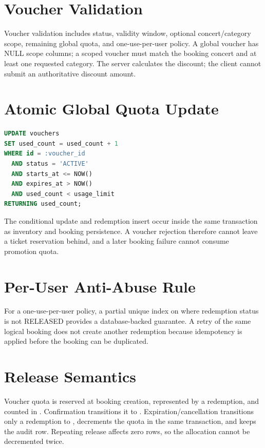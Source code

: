 \section{Voucher Validation}
Voucher validation includes status, validity window, optional concert/category
scope, remaining global quota, and one-use-per-user policy. A global voucher
has NULL scope columns; a scoped voucher must match the booking concert and at
least one requested category. The server calculates the discount; the client
cannot submit an authoritative discount amount.

\section{Atomic Global Quota Update}
\begin{lstlisting}[language=SQL,caption={Atomic voucher quota reservation}]
UPDATE vouchers
SET used_count = used_count + 1
WHERE id = :voucher_id
  AND status = 'ACTIVE'
  AND starts_at <= NOW()
  AND expires_at > NOW()
  AND used_count < usage_limit
RETURNING used_count;
\end{lstlisting}

The conditional update and redemption insert occur inside the same transaction
as inventory and booking persistence. A voucher rejection therefore cannot
leave a ticket reservation behind, and a later booking failure cannot consume
promotion quota.

\section{Per-User Anti-Abuse Rule}
For a one-use-per-user policy, a partial unique index on
 where redemption status is not RELEASED provides
a database-backed guarantee. A retry of the same logical booking does not
create another redemption because idempotency is applied before the booking can
be duplicated.

\section{Release Semantics}
Voucher quota is reserved at booking creation, represented by a
 redemption, and counted in . Confirmation
transitions it to . Expiration/cancellation transitions only a
 redemption to , decrements the quota in the same
transaction, and keeps the audit row. Repeating release affects zero rows, so
the allocation cannot be decremented twice.

